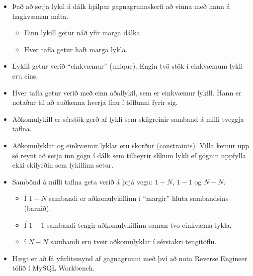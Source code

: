 \begin{itemize}
 \item Það að setja lykil á dálk hjálpar gagnagrunnskerfi að vinna með hann á hagkvæman máta.
 \begin{itemize}
  \item Einn lykill getur náð yfir marga dálka.
  \item Hver tafla getur haft marga lykla.
 \end{itemize}
 \item Lykill getur verið ``einkvæmur'' (unique). Engin tvö stök í einkvæmum lykli eru eins.
 \item Hver tafla getur verið með einn aðallykil, sem er einkvæmur lykill. Hann er notaður til að auðkenna hverja línu í töflunni fyrir sig.
 \item Aðkomulykill er sérstök gerð af lykli sem skilgreinir samband á milli tveggja taflna.
 \item Aðkomulyklar og einkvæmir lyklar eru skorður (constraints). Villa kemur upp sé reynt að setja inn gögn í dálk sem tilheyrir slíkum lykli ef gögnin uppfylla ekki skilyrðin sem lykillinn setur.
 \item Sambönd á milli taflna geta verið á þrjá vegu: $1-N$, $1-1$ og $N-N$.
 \begin{itemize}
  \item Í $1-N$ sambandi er aðkomulykillinn í ``margir'' hluta sambandsins (barnið).
  \item Í $1-1$ sambandi tengir aðkomulykillinn saman tvo einkvæma lykla. 
  \item í $N-N$ sambandi eru tveir aðkomulyklar í sérstakri tengitöflu.
 \end{itemize}
 \item Hægt er að fá yfirlitsmynd af gagnagrunni með því að nota Reverse Engineer tólið í MySQL Workbench.
\end{itemize}





